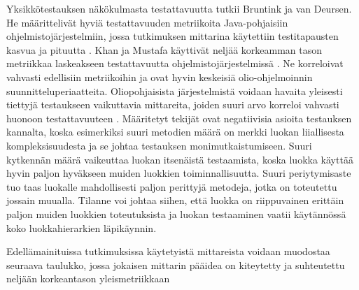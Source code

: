 \documentclass[finnish]{tktltiki2}
\numberwithin{table}{section}
\theoremstyle{definition}
\theoremstyle{remark}
\begin{document}
Yksikkötestauksen näkökulmasta testattavuutta tutkii Bruntink ja van Deursen. He määrittelivät hyviä testattavuuden metriikoita Java-pohjaisiin ohjelmistojärjestelmiin, jossa tutkimuksen mittarina käytettiin testitapausten kasvua ja pituutta \citep{Bruntink:2004}. Khan ja Mustafa käyttivät neljää korkeamman tason metriikkaa laskeakseen testattavuutta ohjelmistojärjestelmissä \citep{Khan:2009:MBT:1507195.1507204}. Ne korreloivat vahvasti edellisiin metriikoihin ja ovat hyvin keskeisiä olio-ohjelmoinnin suunnitteluperiaatteita. Oliopohjaisista järjestelmistä voidaan havaita yleisesti tiettyjä testaukseen vaikuttavia mittareita, joiden suuri arvo korreloi vahvasti huonoon testattavuuteen \citep{Dubey:2011:AMM:2020976.2020983}. Määritetyt tekijät ovat negatiivisia asioita testauksen kannalta, koska esimerkiksi suuri metodien määrä on merkki luokan liiallisesta kompleksisuudesta ja se johtaa testauksen monimutkaistumiseen. Suuri kytkennän määrä vaikeuttaa luokan itsenäistä testaamista, koska luokka käyttää hyvin paljon hyväkseen muiden luokkien toiminnallisuutta. Suuri periytymisaste tuo taas luokalle mahdollisesti paljon perittyjä metodeja, jotka on toteutettu jossain muualla. Tilanne voi johtaa siihen, että luokka on riippuvainen erittäin paljon muiden luokkien toteutuksista ja luokan testaaminen vaatii käytännössä koko luokkahierarkien läpikäynnin. 

Edellämainituissa tutkimuksissa käytetyistä mittareista voidaan muodostaa seuraava taulukko, jossa jokaisen mittarin pääidea on kiteytetty ja suhteutettu neljään korkeantason yleismetriikkaan

\begin{table}[ht]
\centering
	\setlength{\extrarowheight}{4pt}%
\end{table}
\end{document}
